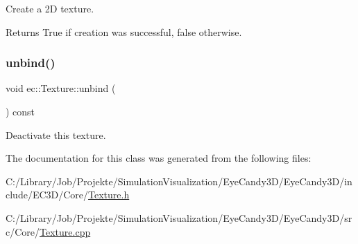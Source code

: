 Create a 2D texture. 

\begin{DoxyReturn}{Returns}
True if creation was successful, false otherwise. 
\end{DoxyReturn}
\mbox{\label{classec_1_1_texture_a95c72abc5c801df231fc970c6adffdcc}} 
\subsubsection{\texorpdfstring{unbind()}{unbind()}}
{\footnotesize\ttfamily void ec\+::\+Texture\+::unbind (\begin{DoxyParamCaption}{ }\end{DoxyParamCaption}) const}

Deactivate this texture. 

The documentation for this class was generated from the following files\+:\begin{DoxyCompactItemize}
\item 
C\+:/\+Library/\+Job/\+Projekte/\+Simulation\+Visualization/\+Eye\+Candy3\+D/\+Eye\+Candy3\+D/include/\+E\+C3\+D/\+Core/\mbox{\hyperlink{_texture_8h}{Texture.\+h}}\item 
C\+:/\+Library/\+Job/\+Projekte/\+Simulation\+Visualization/\+Eye\+Candy3\+D/\+Eye\+Candy3\+D/src/\+Core/\mbox{\hyperlink{_texture_8cpp}{Texture.\+cpp}}\end{DoxyCompactItemize}
